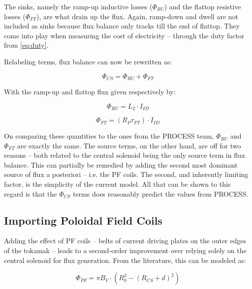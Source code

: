 The sinks, namely the ramp-up inductive losses ($\Phi_{RU}$) and the flattop resistive losses ($\Phi_{FT}$), are what drain up the flux. Again, ramp-down and dwell are not included as sinks because flux balance only tracks till the end of flattop. They come into play when measuring the cost of electricity -- through the duty factor from \cref{eq:duty}.

Relabeling terms, flux balance can now be rewritten as:

\begin{equation}
	\Phi_{CS} = \Phi_{RU} + \Phi_{FT}
\end{equation}

With the ramp-up and flattop flux given respectively by:

\begin{equation}
	\label{eq:phiru}
	\Phi_{RU} = L_2 \cdot I_{ID}
\end{equation}

\begin{equation}
	\label{eq:phift}
	\Phi_{FT} = ( R_P \tau_{FT} ) \cdot I_{ID}
\end{equation}

On comparing these quantities to the ones from the PROCESS team, $\Phi_{RU}$ and $\Phi_{FT}$ are exactly the same. The source terms, on the other hand, are off for two reasons -- both related to the central solenoid being the only source term in flux balance. This can partially be remedied by adding the second most dominant source of flux a posteriori -- i.e. the PF coils. The second, and inherently limiting factor, is the simplicity of the current model. All that can be shown to this regard is that the $\Phi_{CS}$ terms does reasonably predict the values from PROCESS.

\subsection{Importing Poloidal Field Coils}

Adding the effect of PF coils -- belts of current driving plates on the outer edges of the tokamak -- leads to a second-order improvement over relying solely on the central solenoid for flux generation. From the literature, this can be modeled as: \cite{hartmann}

\begin{equation}
	\label{eq:phipf}
	\Phi_{PF} = \pi B_V \cdot \left( R_0^2 - ( R_{CS} + d ) ^ 2 \right)
\end{equation}

